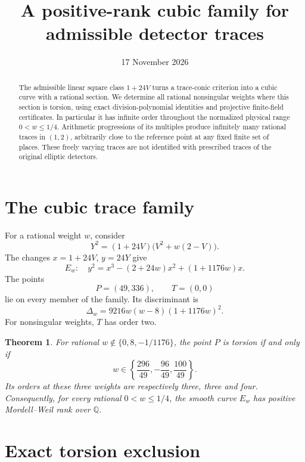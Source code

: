 \documentclass[11pt,a4paper]{article}
\title{A positive-rank cubic family for admissible detector traces}
\author{}\date{17 November 2026}
\newtheorem{theorem}{Theorem}[section]
\newcommand{\Q}{\mathbb Q}\newcommand{\Z}{\mathbb Z}\newcommand{\R}{\mathbb R}
\begin{document}
\maketitle
\begin{abstract}
The admissible linear square class \(1+24V\) turns a trace-conic
criterion into a cubic curve with a rational section. We determine
all rational nonsingular weights where this section is torsion, using
exact division-polynomial identities and projective finite-field
certificates. In particular it has infinite order throughout the
normalized physical range \(0<w\le1/4\). Arithmetic progressions of
its multiples produce infinitely many rational traces in \((1,2)\),
arbitrarily close to the reference point at any fixed finite set of
places. These freely varying traces are not identified with prescribed
traces of the original elliptic detectors.
\end{abstract}

\section{The cubic trace family}

For a rational weight \(w\), consider
\begin{equation}\label{eq:trace}
             Y^2=(1+24V)\bigl(V^2+w(2-V)\bigr).
\end{equation}
The changes \(x=1+24V\), \(y=24Y\) give
\begin{equation}\label{eq:E}
 E_w:\quad y^2=x^3-(2+24w)x^2+(1+1176w)x.
\end{equation}
The points
\[
                        P=(49,336),\qquad T=(0,0)
\]
lie on every member of the family. Its discriminant is
\begin{equation}\label{eq:disc}
                 \Delta_w=9216w(w-8)(1+1176w)^2.
\end{equation}
For nonsingular weights, \(T\) has order two.

\begin{theorem}\label{thm:rank}
For rational \(w\notin\{0,8,-1/1176\}\), the point \(P\) is
torsion if and only if
\[
 w\in\left\{\frac{296}{49},-\frac{96}{49},\frac{100}{49}\right\}.
\]
Its orders at these three weights are respectively three, three and
four. Consequently, for every rational \(0<w\le1/4\), the smooth
curve \(E_w\) has positive Mordell--Weil rank over \(\Q\).
\end{theorem}

\section{Exact torsion exclusion}
\end{document}
